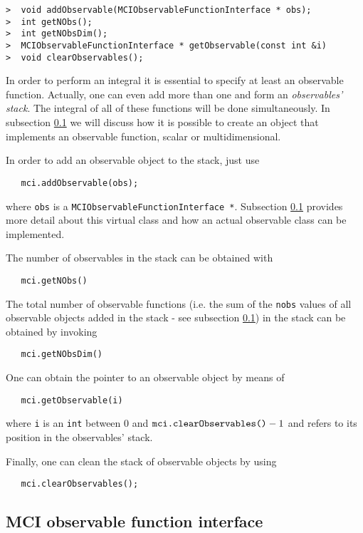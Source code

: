 \documentclass[11pt,a4paper,twoside]{article}
\begin{document}
\begin{verbatim}
>  void addObservable(MCIObservableFunctionInterface * obs);
>  int getNObs();
>  int getNObsDim();
>  MCIObservableFunctionInterface * getObservable(const int &i)  
>  void clearObservables();
\end{verbatim}

In order to perform an integral it is essential to specify at least an observable function.
Actually, one can even add more than one and form an \emph{observables' stack}.
The integral of all of these functions will be done simultaneously.
In subsection \ref{sub:mciobservablefunctioninterface} we will discuss how it is possible to create an object that implements an observable function, scalar or multidimensional.

In order to add an observable object to the stack, just use
\begin{verbatim}
   mci.addObservable(obs);
\end{verbatim}
where \verb+obs+ is a \verb+MCIObservableFunctionInterface *+.
Subsection \ref{sub:mciobservablefunctioninterface} provides more detail about this virtual class and how an actual observable class can be implemented.

The number of observables in the stack can be obtained with
\begin{verbatim}
   mci.getNObs()
\end{verbatim}

The total number of observable functions (i.e. the sum of the \verb+nobs+ values of all observable objects added in the stack - see subsection \ref{sub:mciobservablefunctioninterface}) in the stack can be obtained by invoking
\begin{verbatim}
   mci.getNObsDim()
\end{verbatim}

One can obtain the pointer to an observable object by means of
\begin{verbatim}
   mci.getObservable(i)
\end{verbatim}
where \verb+i+ is an \verb+int+ between $0$ and $\verb+mci.clearObservables()+ -1$ and refers to its position in the observables' stack.

Finally, one can clean the stack of observable objects by using
\begin{verbatim}
   mci.clearObservables();
\end{verbatim}


\subsection{MCI observable function interface} %
\label{sub:mciobservablefunctioninterface}
\end{document}
